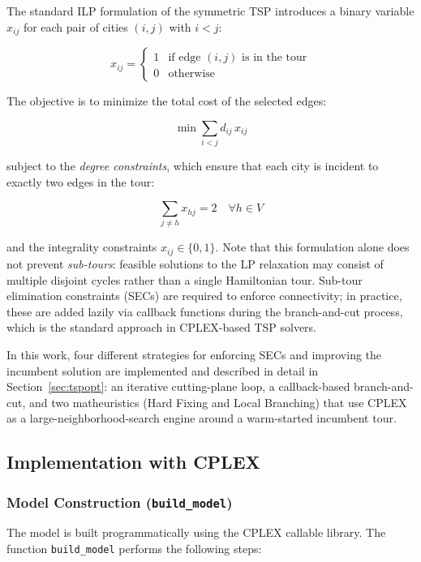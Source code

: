 \documentclass{article}
\begin{document}
The standard ILP formulation of the symmetric TSP introduces a binary variable $x_{ij}$ for
each pair of cities $(i, j)$ with $i < j$:

\[
x_{ij} = \begin{cases} 1 & \text{if edge } (i,j) \text{ is in the tour} \\ 0 & \text{otherwise} \end{cases}
\]

The objective is to minimize the total cost of the selected edges:

\[
\min \sum_{i < j} d_{ij} \, x_{ij}
\]

subject to the \textit{degree constraints}, which ensure that each city is incident to
exactly two edges in the tour:

\[
\sum_{j \neq h} x_{hj} = 2 \quad \forall h \in V
\]

and the integrality constraints $x_{ij} \in \{0, 1\}$. Note that this formulation alone does
not prevent \textit{sub-tours}: feasible solutions to the LP relaxation may consist of
multiple disjoint cycles rather than a single Hamiltonian tour. Sub-tour elimination
constraints (SECs) are required to enforce connectivity; in practice, these are added lazily
via callback functions during the branch-and-cut process, which is the standard approach in
CPLEX-based TSP solvers.

In this work, four different strategies for enforcing SECs and improving the incumbent
solution are implemented and described in detail in Section~\ref{sec:tspopt}: an iterative
cutting-plane loop, a callback-based branch-and-cut, and two matheuristics (Hard Fixing and
Local Branching) that use CPLEX as a large-neighborhood-search engine around a warm-started
incumbent tour.

\subsection{Implementation with CPLEX}

\subsubsection{Model Construction (\texttt{build\_model})}

The model is built programmatically using the CPLEX callable library. The function
\texttt{build\_model} performs the following steps:
\end{document}
